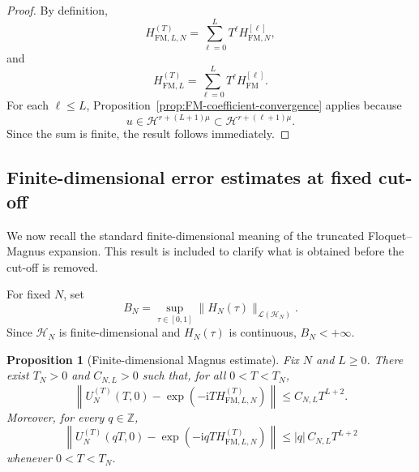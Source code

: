 \documentclass[11pt]{amsart}
\theoremstyle{plain}
\newtheorem{proposition}[theorem]{Proposition}
\theoremstyle{definition}
\theoremstyle{remark}
\newcommand{\Hilb}{\mathcal H}
\newcommand{\ii}{\mathrm i}
\begin{document}
\begin{proof}
By definition,
\[
        H_{\mathrm{FM},L,N}^{(T)}
        =
        \sum_{\ell=0}^{L}
        T^\ell H_{\mathrm{FM},N}^{[\ell]},
\]
and
\[
        H_{\mathrm{FM},L}^{(T)}
        =
        \sum_{\ell=0}^{L}
        T^\ell H_{\mathrm{FM}}^{[\ell]}.
\]
For each \(\ell\leq L\), Proposition~\ref{prop:FM-coefficient-convergence}
applies because
\[
        u\in\Hilb^{r+(L+1)\mu}
        \subset
        \Hilb^{r+(\ell+1)\mu}.
\]
Since the sum is finite, the result follows immediately.
\end{proof}

\subsection{Finite-dimensional error estimates at fixed cut-off}

We now recall the standard finite-dimensional meaning of the truncated
Floquet--Magnus expansion.  This result is included to clarify what is
obtained before the cut-off is removed.

For fixed \(N\), set
\[
        B_N=\sup_{\tau\in[0,1]}\|H_N(\tau)\|_{\mathcal L(\Hilb_N)}.
\]
Since \(\Hilb_N\) is finite-dimensional and \(H_N(\tau)\) is continuous,
\(B_N<+\infty\).

\begin{proposition}[Finite-dimensional Magnus estimate]
\label{prop:finite-Magnus-estimate}
Fix \(N\) and \(L\geq0\).  There exist \(T_N>0\) and \(C_{N,L}>0\) such
that, for all \(0<T<T_N\),
\[
        \left\|
        U_N^{(T)}(T,0)
        -
        \exp\left(-\ii T H_{\mathrm{FM},L,N}^{(T)}\right)
        \right\|
        \leq
        C_{N,L}T^{L+2}.
\]
Moreover, for every \(q\in\mathbb Z\),
\[
        \left\|
        U_N^{(T)}(qT,0)
        -
        \exp\left(-\ii qT H_{\mathrm{FM},L,N}^{(T)}\right)
        \right\|
        \leq
        |q|\,C_{N,L}T^{L+2}
\]
whenever \(0<T<T_N\).
\end{proposition}
\end{document}
